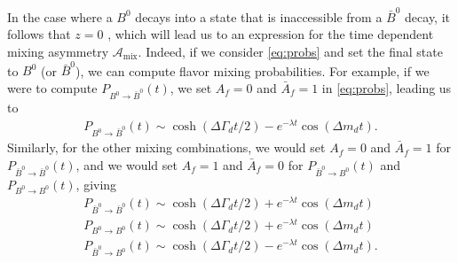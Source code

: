 In the case where a $B^0$ decays into a state that is inaccessible from a $\bar{B}^0$ decay, it follows that $z=0$ \cite{Bevan}, which will lead us to an expression for the time dependent mixing asymmetry $\mathcal{A}_{\text{mix}}$. Indeed, if we consider \ref{eq:probs} and set the final state to $B^0$ (or $\bar{B}^0$), we can compute flavor mixing probabilities. For example, if we were to compute $P_{B^0\rightarrow \bar{B}^0}(t)$, we set $A_f = 0$ and $\bar{A}_f = 1$ in \ref{eq:probs}, leading us to
\begin{align}
\label{eq:prob1}
P_{B^0\rightarrow \bar{B}^0}(t) \sim \cosh(\Delta \Gamma_d t/2)-e^{-\lambda t}\cos(\Delta m_dt).
\end{align}
Similarly, for the other mixing combinations, we would set $A_f = 0$ and $\bar{A}_f = 1$ for $P_{\bar{B}^0\rightarrow \bar{B}^0}(t)$, and we would set $A_f = 1$ and $\bar{A}_f = 0$ for $P_{\bar{B}^0\rightarrow B^0}(t)$ and $P_{B^0\rightarrow B^0}(t)$, giving
\begin{align}
P_{\bar{B}^0\rightarrow \bar{B}^0}(t) \sim \cosh(\Delta \Gamma_d t/2)+e^{-\lambda t}\cos(\Delta m_dt) \\
P_{B^0\rightarrow B^0}(t) \sim \cosh(\Delta \Gamma_d t/2)+e^{-\lambda t}\cos(\Delta m_dt)\\
\label{eq:prob2}
P_{\bar{B}^0\rightarrow B^0}(t) \sim \cosh(\Delta \Gamma_d t/2)-e^{-\lambda t}\cos(\Delta m_dt).
\end{align}


